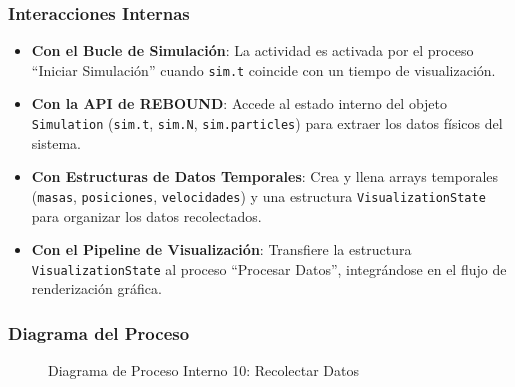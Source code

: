 \subsubsection{Interacciones Internas}
\begin{itemize}
    \item \textbf{Con el Bucle de Simulación}: La actividad es activada por el proceso ``Iniciar Simulación'' cuando \texttt{sim.t} coincide con un tiempo de visualización.
    \item \textbf{Con la API de REBOUND}: Accede al estado interno del objeto \texttt{Simulation} (\texttt{sim.t}, \texttt{sim.N}, \texttt{sim.particles}) para extraer los datos físicos del sistema.
    \item \textbf{Con Estructuras de Datos Temporales}: Crea y llena arrays temporales (\texttt{masas}, \texttt{posiciones}, \texttt{velocidades}) y una estructura \texttt{VisualizationState} para organizar los datos recolectados.
    \item \textbf{Con el Pipeline de Visualización}: Transfiere la estructura \texttt{VisualizationState} al proceso ``Procesar Datos'', integrándose en el flujo de renderización gráfica.
\end{itemize}
\newpage
\subsubsection{Diagrama del Proceso}
\begin{figure}[H]
    \centering
    \caption{Diagrama de Proceso Interno 10: Recolectar Datos}%
    \label{fig:process_diagram10}
\end{figure}
\newpage